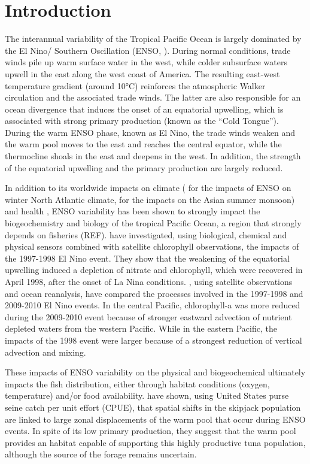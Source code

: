 \section{Introduction}

The interannual variability of the Tropical Pacific Ocean is largely dominated by the El Nino/ Southern Oscillation (ENSO, \citealt{trenberthNinoSouthernOscillation2019}). During normal conditions, trade winds pile up warm surface water in the west, while colder subsurface waters upwell in the east along the west coast of America. The resulting east-west temperature gradient (around 10°C) reinforces the atmospheric Walker circulation and the associated trade winds. The latter are also responsible for an ocean divergence that induces the onset of an equatorial upwelling, which is associated with strong primary production (known as the “Cold Tongue”). During the warm ENSO phase, known as El Nino, the trade winds weaken and the warm pool moves to the east and reaches the central equator, while the thermocline shoals in the east and deepens in the west. In addition, the strength of the equatorial upwelling and the primary production are largely reduced.

In addition to its worldwide impacts on climate (\citealt{toniazzoInfluenceENSOWinter2006} for the impacts of ENSO on winter North Atlantic climate, \citealt{juAsianSummerMonsoon1995} for the impacts on the Asian summer monsoon) and health \cite{kovatsNinoHealth2003}, ENSO variability has been shown to strongly impact the biogeochemistry and biology of the tropical Pacific Ocean, a region that strongly depends on fisheries (REF). \cite{chavezBiologicalChemicalResponse1999} have investigated, using biological, chemical and physical sensors combined with satellite chlorophyll observations, the impacts of the 1997-1998 El Nino event. They show that the weakening of the equatorial upwelling induced a depletion of nitrate and chlorophyll, which were recovered in April 1998, after the onset of La Nina conditions. \cite{gierachBiologicalResponse19972012}, using satellite observations and ocean reanalysis, have compared the processes involved in the 1997-1998 and 2009-2010 El Nino events. In the central Pacific, chlorophyll-a was more reduced during the 2009-2010 event because of stronger eastward advection of nutrient depleted waters from the western Pacific. While in the eastern Pacific, the impacts of the 1998 event were larger because of a strongest reduction of vertical advection and mixing.

These impacts of ENSO variability on the physical and biogeochemical ultimately impacts the fish distribution, either through habitat conditions (oxygen, temperature) and/or food availability. \cite{lehodeyNinoSouthernOscillation1997}  have shown, using United States purse seine catch per unit effort (CPUE), that spatial shifts in the skipjack population are linked to large zonal displacements of the warm pool that occur during ENSO  events. In spite of its low primary production, they suggest that the warm pool provides an habitat capable of supporting this highly productive tuna population, although the source of the forage remains uncertain.


